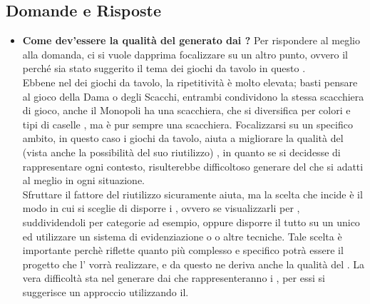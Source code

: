 	  \subsection{Domande e Risposte}
	   \begin{itemize}
	   
	   	\item 
	   		\textbf{Come dev'essere la qualità del  generato dai ?}
	    	\justifying     		
Per rispondere al meglio alla domanda, ci si vuole dapprima focalizzare su un altro punto, ovvero il perché sia stato suggerito il tema dei giochi da tavolo in questo .\\
Ebbene nel  dei giochi da tavolo, la ripetitività è molto elevata; basti pensare al gioco della Dama o degli Scacchi, entrambi condividono la stessa scacchiera di gioco, anche il Monopoli ha una scacchiera, che si diversifica per colori e tipi di caselle , ma è pur sempre una scacchiera. Focalizzarsi su un specifico ambito, in questo caso i giochi da tavolo, aiuta a migliorare la qualità del  (vista anche la possibilità del suo riutilizzo) , in quanto se si decidesse di rappresentare ogni contesto, risulterebbe difficoltoso generare del  che si adatti al meglio in ogni situazione.\\Sfruttare il fattore del riutilizzo sicuramente aiuta, ma la scelta che incide è il modo in cui si sceglie di disporre i , ovvero se visualizzarli per  , suddividendoli per categorie ad esempio, oppure disporre il tutto su un unico  ed utilizzare un sistema di evidenziazione o  o altre tecniche. Tale scelta è importante perchè riflette quanto più complesso e specifico potrà essere il progetto che l' vorrà realizzare, e da questo ne deriva anche la qualità del .
      		La vera difficoltà sta nel generare  dai  che rappresenteranno i , per essi si suggerisce un approccio utilizzando il.\\


\end{itemize}
